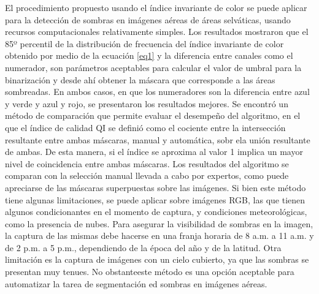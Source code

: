 El procedimiento propuesto usando el índice invariante de color se puede aplicar para la detección de sombras en imágenes aéreas de áreas selváticas, usando recursos computacionales relativamente simples. Los resultados mostraron que el 85º percentil de la distribución de frecuencia del índice invariante de color obtenido por medio de la ecuación \ref{eq1} y la diferencia entre canales como el numerador, son parámetros aceptables para calcular el valor de umbral para la binarización y desde ahí obtener la máscara que corresponde a las áreas sombreadas.
En ambos casos, en que los numeradores son la diferencia entre azul y verde y azul y rojo, se presentaron los resultados mejores. Se encontró un método de comparación que permite evaluar el desempeño del algoritmo, en el que el índice de calidad QI se definió como el cociente entre la intersección resultante entre ambas máscaras, manual y automática, sobr ela unión resultante de ambas. De esta manera, si el índice se aproxima al valor 1 implica un mayor nivel de coincidencia entre ambas máscaras. Los resultados del algoritmo se comparan con la selección manual llevada a cabo por expertos, como puede apreciarse de las máscaras superpuestas sobre las imágenes. Si bien este método tiene algunas limitaciones, se puede aplicar sobre imágenes RGB, las que tienen algunos condicionantes en el momento de captura, y condiciones meteorológicas, como la presencia de nubes. Para asegurar la visibilidad de sombras en la imagen, la captura de las mismas debe hacerse en una franja horaria de 8 a.m. a 11 a.m. y de 2 p.m. a 5 p.m., dependiendo de la época del año y de la latitud. Otra limitación es la captura de imágenes con un cielo cubierto, ya que las sombras se presentan muy tenues. No obstanteeste método es una opción aceptable para automatizar la tarea de segmentación ed sombras en imágenes aéreas.
